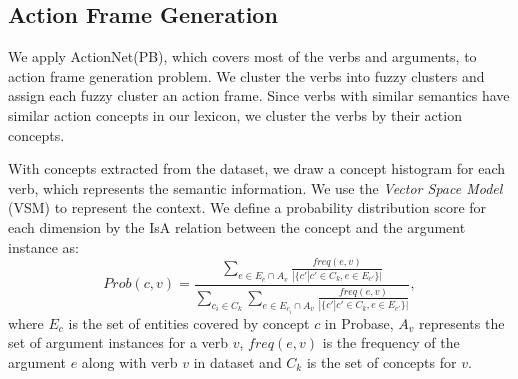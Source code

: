 \subsection{Action Frame Generation}
We apply ActionNet(PB), which covers most of the verbs
and arguments, to action frame generation problem.
We cluster the verbs into fuzzy clusters and assign each
fuzzy cluster an action frame.
Since verbs with similar semantics have similar action concepts in our lexicon,
we cluster the verbs by their action concepts.

With concepts extracted from the dataset, we draw a concept histogram for
each verb, which represents the semantic information.
We use the \emph{Vector Space Model} (VSM) to represent the context.
We define a probability distribution score for each dimension
by the IsA relation between the concept and the argument instance as:
$$
Prob(c,v)=\frac{\sum_{e\in E_c\cap A_v}{\frac{freq(e,v)}{|\{c'|c'\in C_k,
e\in E_{c'}\}|}}}{\sum_{c_i\in C_k}{\sum_{e\in E_{c_i}\cap A_v}{\frac{freq(e,v)}{|\{c'|c'\in C_k, e\in E_{c'}\}|}}}},
$$
where $E_c$ is the set of entities covered by concept $c$ in Probase, $A_v$ represents the set of argument instances
for a verb $v$, $freq(e,v)$ is the frequency of the argument $e$ along with verb $v$ in dataset and $C_k$ is the set of concepts for $v$.

